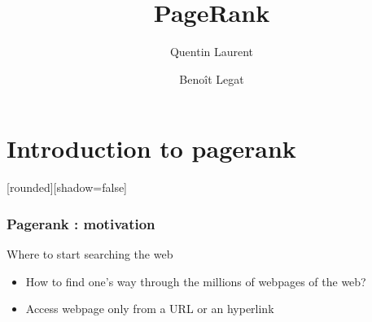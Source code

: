 \documentclass[10pt]{beamer}
\title{PageRank}
\author{
  Quentin Laurent
  \and
  Benoît Legat
}
\begin{document}
\begin{frame}
  \maketitle
\end{frame}
\begin{frame}
  \tableofcontents
\end{frame}
\section{Introduction to pagerank}
[rounded][shadow=false]
\begin{frame}
  \frametitle{Pagerank : motivation}
  \begin{block}{Where to start searching the web}
  \begin{itemize}
    \item How to find one's way through the millions of webpages of the web?
    \item Access webpage only from a URL or an hyperlink
    \end{itemize}
  \end{block}
\end{frame}
\end{document}
